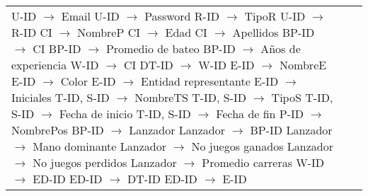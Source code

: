 \documentclass{report}
\begin{document}
\begin{tabularx}{\textwidth}{|X|X|X|}
        U-ID $\rightarrow$ Email \newline 
        U-ID $\rightarrow$ Password \newline 
        R-ID $\rightarrow$ TipoR \newline 
        U-ID $\rightarrow$ R-ID \newline 
        CI $\rightarrow$ NombreP \newline 
        CI $\rightarrow$ Edad \newline 
        CI $\rightarrow$ Apellidos \newline 
        BP-ID $\rightarrow$ CI \newline 
        BP-ID $\rightarrow$ Promedio de bateo \newline 
        BP-ID $\rightarrow$ Años de experiencia \newline 
        W-ID $\rightarrow$ CI \newline 
        DT-ID $\rightarrow$ W-ID \newline 
        E-ID $\rightarrow$ NombreE \newline 
        E-ID $\rightarrow$ Color \newline 
        E-ID $\rightarrow$ Entidad representante \newline 
        E-ID $\rightarrow$ Iniciales \newline 
        T-ID, S-ID $\rightarrow$ NombreTS \newline 
        T-ID, S-ID $\rightarrow$ TipoS \newline 
        T-ID, S-ID $\rightarrow$ Fecha de inicio \newline 
        T-ID, S-ID $\rightarrow$ Fecha de fin \newline 
        P-ID $\rightarrow$ NombrePos \newline 
        BP-ID $\rightarrow$ Lanzador \newline 
        Lanzador $\rightarrow$ BP-ID \newline 
        Lanzador $\rightarrow$ Mano dominante \newline 
        Lanzador $\rightarrow$ No juegos ganados \newline 
        Lanzador $\rightarrow$ No juegos perdidos \newline 
        Lanzador $\rightarrow$ Promedio carreras \newline 
        W-ID $\rightarrow$ ED-ID \newline 
        ED-ID $\rightarrow$ DT-ID \newline 
        ED-ID $\rightarrow$ E-ID \newline 

\end{tabularx}
\end{document}
